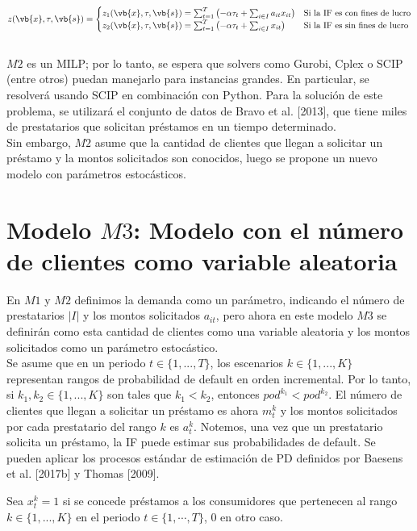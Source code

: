 \[ z(\vb{x}, \tau, \vb{s}) = \begin{cases} z_1(\vb{x}, \tau, \vb{s}) = \sum_{t=1}^{T}\left(- \alpha\tau_t + \sum_{i \in I} a_{it} x_{it}\right) & \text{Si la IF es con fines de lucro} \\ z_2(\vb{x}, \tau, \vb{s}) = \sum_{t=1}^{T} \left(- \alpha\tau_t + \sum_{i \in I} x_{it}\right) & \text{Si la IF es sin fines de lucro} \end{cases} \] \\

$M2$ es un MILP; por lo tanto, se espera que solvers como Gurobi, Cplex o SCIP (entre otros) puedan manejarlo para instancias grandes. En particular, se resolverá usando SCIP en combinación con Python. Para la solución de este problema, se utilizará el conjunto de datos de Bravo et al. [2013], que tiene miles de prestatarios que solicitan préstamos en un tiempo determinado. \\

Sin embargo, $M2$ asume que la cantidad de clientes que llegan a solicitar un préstamo y la montos solicitados son conocidos, luego se propone un nuevo modelo con parámetros estocásticos.

\section{Modelo $M3$: Modelo con el número de clientes como variable aleatoria}

En $M1$ y $M2$ definimos la demanda como un parámetro, indicando el número de prestatarios $|I|$ y los montos solicitados $a_{it}$, pero ahora en este modelo $M3$ se definirán como esta cantidad de clientes como una variable aleatoria y los montos solicitados como un parámetro estocástico. \\

Se asume que en un periodo $t \in \{1,...,T\}$, los escenarios $k \in \{1,...,K\}$ representan rangos de probabilidad de default en orden incremental. Por lo tanto, si $k_1, k_2 \in \{1,...,K\}$ son tales que $k_1 < k_2$, entonces $pod^{k_1}< pod^{k_2}$. El número de clientes que llegan a solicitar un préstamo es ahora $m_{t}^{k}$ y los montos solicitados por cada prestatario del rango $k$ es $a_{t}^{k}$. Notemos, una vez que un prestatario solicita un préstamo, la IF puede estimar sus probabilidades de default. Se pueden aplicar los procesos estándar de estimación de PD definidos por Baesens et al. [2017b] y Thomas [2009].

Sea $x_{t}^{k} = 1$ si se concede préstamos a los consumidores que pertenecen al rango $k \in \{1,...,K\}$ en el periodo $t \in \{1,\cdots,T\}$, 0 en otro caso. 

